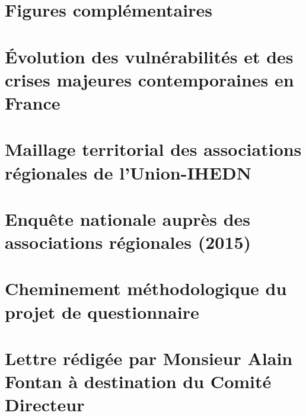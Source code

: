 \documentclass[12pt,a4paper]{article}
\newcommand{\UnionIHEDN}{Union-IHEDN}
\newcommand{\AssociationsRegionalesIHEDN}{associations régionales de l'\UnionIHEDN}
\begin{document}


\clearpage

\appendix
\section{Figures complémentaires}
\label{annexe:figures_complementaires}



\section{Évolution des vulnérabilités et des crises majeures contemporaines en France}
\label{annexe:tableau_crises_majeures}




\clearpage

\section{Maillage territorial des \AssociationsRegionalesIHEDN}
\label{annexe:maillage_territorial_ihedn}



\section{Enquête nationale auprès des associations régionales (2015)}
\label{annexe:enquete_nationale_ar_2015}




\section{Cheminement méthodologique du projet de questionnaire}
\label{annexe:cheminement_questionnaire}



\clearpage

\section{Lettre rédigée par Monsieur Alain Fontan à destination du Comité Directeur}
\label{annexe:lettre_CODIR}
\end{document}
